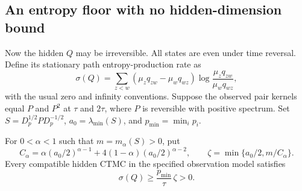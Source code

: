 \subsection{An entropy floor with no hidden-dimension bound}

Now the hidden $Q$ may be irreversible. All states are even under time
reversal. Define its stationary path entropy-production rate as
\[
 \sigma(Q)=\sum_{z<w}(\mu_zq_{zw}-\mu_wq_{wz})
             \log\frac{\mu_zq_{zw}}{\mu_wq_{wz}},
\]
with the usual zero and infinity conventions. Suppose the observed pair
kernels equal $P$ and $P^2$ at $\tau$ and $2\tau$, where $P$ is reversible
with positive spectrum. Set $S=D_p^{1/2}PD_p^{-1/2}$,
$a_0=\lambda_{\min}(S)$, and $p_{\min}=\min_i p_i$.

\begin{theorem}
\label{thm:hidden-entropy}
For $0<\alpha<1$ such that $m=m_\alpha(S)>0$, put
\[
 C_\alpha=\alpha(a_0/2)^{\alpha-1}
                  +4(1-\alpha)(a_0/2)^{\alpha-2},\qquad
 \zeta=\min\{a_0/2,m/C_\alpha\}.
\]
Every compatible hidden CTMC in the specified observation model satisfies
\[
 \boxed{\quad \sigma(Q)\geq\frac{p_{\min}}{\tau}\,\zeta>0.\quad}
\tag{H2}
\]
\end{theorem}

